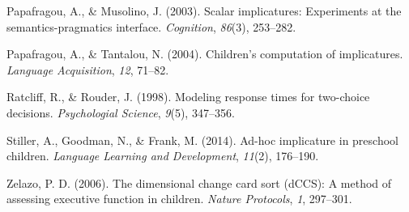 \documentclass[10pt, letterpaper]{article}
\begin{document}
Papafragou, A., \& Musolino, J. (2003). Scalar implicatures: Experiments
at the semantics-pragmatics interface. \emph{Cognition}, \emph{86}(3),
253--282.

Papafragou, A., \& Tantalou, N. (2004). Children's computation of
implicatures. \emph{Language Acquisition}, \emph{12}, 71--82.

Ratcliff, R., \& Rouder, J. (1998). Modeling response times for
two-choice decisions. \emph{Psychologial Science}, \emph{9}(5),
347--356.

Stiller, A., Goodman, N., \& Frank, M. (2014). Ad-hoc implicature in
preschool children. \emph{Language Learning and Development},
\emph{11}(2), 176--190.

Zelazo, P. D. (2006). The dimensional change card sort (dCCS): A method
of assessing executive function in children. \emph{Nature Protocols},
\emph{1}, 297--301.
\end{document}
